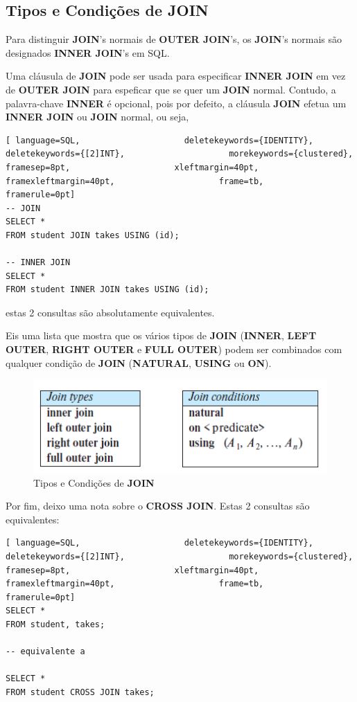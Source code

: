 \documentclass[titlepage]{book}
\theoremstyle{definition}
\begin{document}
\subsection{Tipos e Condições de JOIN}
Para distinguir \textbf{JOIN}'s normais de \textbf{OUTER JOIN}'s, os \textbf{JOIN}'s normais são designados \textbf{INNER JOIN}'s em SQL.

Uma cláusula de \textbf{JOIN} pode ser usada para especificar \textbf{INNER JOIN} em vez de \textbf{OUTER JOIN} para espeficar que se quer um \textbf{JOIN} normal. Contudo, a palavra-chave \textbf{INNER} é opcional, pois por defeito, a cláusula \textbf{JOIN} efetua um \textbf{INNER JOIN} ou \textbf{JOIN} normal, ou seja,

\begin{lstlisting}[ language=SQL,                     deletekeywords={IDENTITY},                     deletekeywords={[2]INT},                     morekeywords={clustered},                     framesep=8pt,                     xleftmargin=40pt,                     framexleftmargin=40pt,                     frame=tb,                     framerule=0pt]
-- JOIN
SELECT *
FROM student JOIN takes USING (id);

-- INNER JOIN
SELECT *
FROM student INNER JOIN takes USING (id);
\end{lstlisting}
estas 2 consultas são absolutamente equivalentes.

Eis uma lista que mostra que os vários tipos de \textbf{JOIN} (\textbf{INNER}, \textbf{LEFT OUTER}, \textbf{RIGHT OUTER} e \textbf{FULL OUTER}) podem ser combinados com qualquer condição de \textbf{JOIN} (\textbf{NATURAL}, \textbf{USING} ou \textbf{ON}).

\begin{figure}[H]
    \centering
    \includegraphics[scale = 0.6]{cap2/join_tipos_conds.png}
    \caption{Tipos e Condições de \textbf{JOIN}}
\end{figure}

Por fim, deixo uma nota sobre o \textbf{CROSS JOIN}. Estas 2 consultas são equivalentes:
\begin{lstlisting}[ language=SQL,                     deletekeywords={IDENTITY},                     deletekeywords={[2]INT},                     morekeywords={clustered},                     framesep=8pt,                     xleftmargin=40pt,                     framexleftmargin=40pt,                     frame=tb,                     framerule=0pt]
SELECT *
FROM student, takes;

-- equivalente a

SELECT *
FROM student CROSS JOIN takes;
\end{lstlisting}
\end{document}
